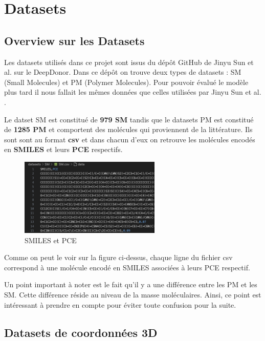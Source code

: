 \section{Datasets}

\subsection{Overview sur les Datasets} 

Les datasets utilisés dans ce projet sont issus du dépôt GitHub de Jinyu Sun et al. \cite{Sun} sur le DeepDonor.
Dans ce dépôt on trouve deux types de datasets : SM (Small Molecules) et PM (Polymer Molecules). Pour pouvoir évalué le modèle plus tard il nous fallait les mêmes données que celles utilisées par Jinyu Sun et al. \cite{Sun}.

Le datset SM est constitué de \textbf{979 SM} tandis que le datasets PM est constitué de \textbf{1285 PM} et comportent des molécules qui proviennent de la littérature.
Ils sont sont au format \textbf{csv} et dans chacun d'eux on retrouve les molécules encodés en \textbf{SMILES} et leurs \textbf{PCE} respectifs.

\begin{figure}[htbp]
    \centering
    \includegraphics[width=0.6\textwidth]{Datasets/data.png}
    \caption{SMILES et PCE}
\end{figure}

Comme on peut le voir sur la figure ci-dessus, chaque ligne du fichier csv correspond à une molécule encodé en SMILES associées à leurs PCE respectif.

Un point important à noter est le fait qu'il y a une différence entre les PM et les SM. Cette différence réside au niveau de la masse moléculaires.
Ainsi, ce point est intéressant à prendre en compte pour éviter toute confusion pour la suite.

\subsection{Datasets de coordonnées 3D}

